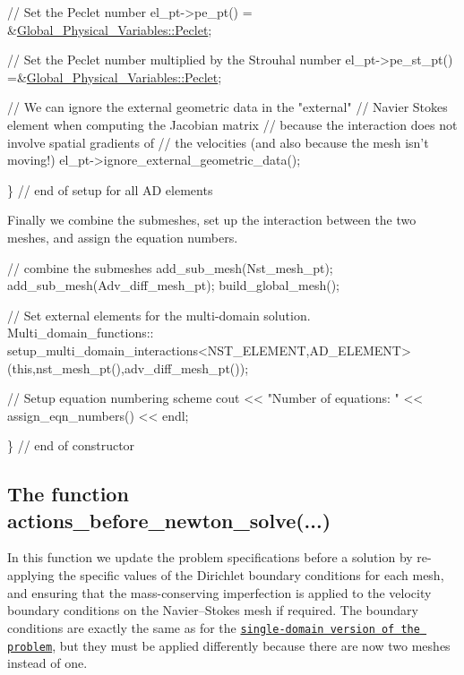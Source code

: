\begin{DoxyCodeInclude}
   \textcolor{comment}{// Set the Peclet number}
   el\_pt->pe\_pt() = &\hyperlink{namespaceGlobal__Physical__Variables_ad4cdf142ba50635d62ac4c614f445af7}{Global\_Physical\_Variables::Peclet};

   \textcolor{comment}{// Set the Peclet number multiplied by the Strouhal number}
   el\_pt->pe\_st\_pt() =&\hyperlink{namespaceGlobal__Physical__Variables_ad4cdf142ba50635d62ac4c614f445af7}{Global\_Physical\_Variables::Peclet};

   \textcolor{comment}{// We can ignore the external geometric data in the "external"}
   \textcolor{comment}{// Navier Stokes element when computing the Jacobian matrix}
   \textcolor{comment}{// because the interaction does not involve spatial gradients of }
   \textcolor{comment}{// the velocities (and also because the mesh isn't moving!)}
   el\_pt->ignore\_external\_geometric\_data();

  \} \textcolor{comment}{// end of setup for all AD elements}

\end{DoxyCodeInclude}


Finally we combine the submeshes, set up the interaction between the two meshes, and assign the equation numbers.


\begin{DoxyCodeInclude}
 \textcolor{comment}{// combine the submeshes}
 add\_sub\_mesh(Nst\_mesh\_pt);
 add\_sub\_mesh(Adv\_diff\_mesh\_pt);
 build\_global\_mesh();
 
 \textcolor{comment}{// Set external elements for the multi-domain solution.}
 Multi\_domain\_functions::
  setup\_multi\_domain\_interactions<NST\_ELEMENT,AD\_ELEMENT>
  (\textcolor{keyword}{this},nst\_mesh\_pt(),adv\_diff\_mesh\_pt());
 
 \textcolor{comment}{// Setup equation numbering scheme}
 cout << \textcolor{stringliteral}{"Number of equations: "} << assign\_eqn\_numbers() << endl; 

\} \textcolor{comment}{// end of constructor}

\end{DoxyCodeInclude}




\hypertarget{index_actions_before_newton_solve}{}\subsection{The function actions\+\_\+before\+\_\+newton\+\_\+solve(...)}\label{index_actions_before_newton_solve}
In this function we update the problem specifications before a solution by re-\/applying the specific values of the Dirichlet boundary conditions for each mesh, and ensuring that the mass-\/conserving imperfection is applied to the velocity boundary conditions on the Navier--Stokes mesh if required. The boundary conditions are exactly the same as for the \href{../../b_convection/html/index.html}{\tt single-\/domain version of the problem}, but they must be applied differently because there are now two meshes instead of one.

